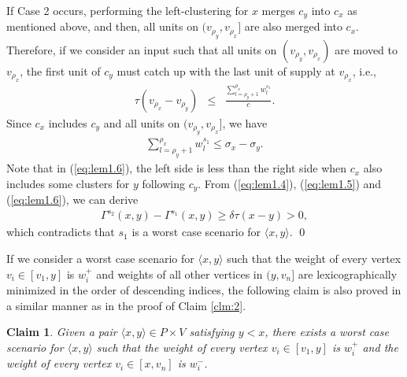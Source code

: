 \documentclass[a4paper]{llncs}
\newtheorem{clm}{Claim}
\begin{document}
If Case 2 occurs, 
performing the left-clustering for $x$ merges $c_y$ into $c_x$ as mentioned above,
and then, all units on $(v_{\rho_y}, v_{\rho_x}]$ are also merged into $c_x$.
Therefore, if we consider an input such that all units on $(v_{\rho_y}, v_{\rho_x})$ are moved to $v_{\rho_x}$,
the first unit of $c_y$ must catch up with the last unit of supply at $v_{\rho_x}$,
i.e.,
\begin{eqnarray}
\tau(v_{\rho_x}-v_{\rho_y}) &\le& \frac{\sum_{l=\rho_y+1}^{\rho_x} w^{s_1}_l}{c}.
\label{eq:lem1.5}
\end{eqnarray}
Since $c_x$ includes $c_y$ and all units on $(v_{\rho_y}, v_{\rho_x}]$, we have
\begin{eqnarray}
\sum_{l=\rho_y+1}^{\rho_x} w^{s_1}_l \le \sigma_x-\sigma_y.
\label{eq:lem1.6}
\end{eqnarray}
Note that in (\ref{eq:lem1.6}), the left side is less than the right side when $c_x$ also includes some clusters for $y$ following $c_y$.
From (\ref{eq:lem1.4}), (\ref{eq:lem1.5}) and (\ref{eq:lem1.6}), we can derive 
\begin{eqnarray}
\Gamma^{s_2}(x, y) - \Gamma^{s_1}(x, y)	\ge \delta\tau(x - y) > 0,
\label{eq:lem1.7}
\end{eqnarray}
which contradicts that $s_1$ is a worst case scenario for $\langle x, y \rangle$.
\qed


\medskip

If we consider a worst case scenario for $\langle x, y \rangle$ such that the weight of every vertex $v_i \in [v_1, y]$ is $w^+_i$ and weights of all other vertices in $(y, v_n]$ are lexicographically minimized in the order of descending indices,
the following claim is also proved in a similar manner as in the proof of Claim \ref{clm:2}.
\begin{clm}
Given a pair $\langle x, y \rangle \in P \times V$ satisfying $y < x$,
there exists a worst case scenario for $\langle x, y \rangle$ such that 
the weight of every vertex $v_i \in [v_1, y]$ is $w^+_i$ and 
the weight of every vertex $v_i \in [x, v_n]$ is $w^-_i$.
\label{clm:3}
\end{clm}
\end{document}
